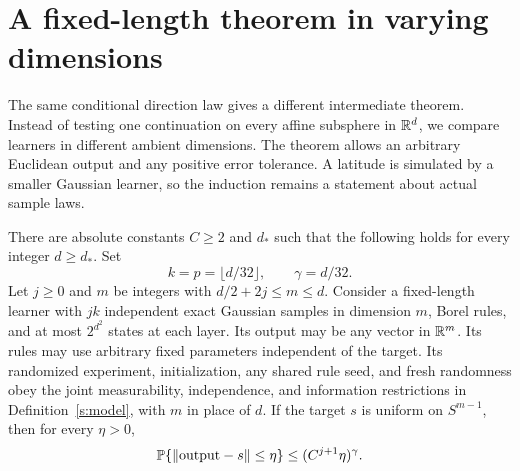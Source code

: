 \section{A fixed-length theorem in varying dimensions}\label{s:fixed-length}

The same conditional direction law gives a different intermediate
theorem. Instead of testing one continuation on every affine
subsphere in \(\mathbb R^d\), we compare learners in different ambient
dimensions. The theorem allows an arbitrary Euclidean output and any
positive error tolerance. A latitude is simulated by a smaller
Gaussian learner, so the induction remains a statement about actual
sample laws.

\begin{proposition}\label{s:fixed-proposition}
There are absolute constants \(C\ge2\) and \(d_*\) such that the
following holds for every integer \(d\ge d_*\). Set
\[
 k=p=\lfloor d/32\rfloor,\qquad \gamma=d/32.
\]
Let \(j\ge0\) and \(m\) be integers with \(d/2+2j\le m\le d\).
Consider a fixed-length learner with \(jk\) independent exact Gaussian
samples in dimension \(m\), Borel rules, and at most \(2^{d^2}\)
states at each layer. Its output may be any vector in \(\mathbb R^m\).
Its rules may use arbitrary fixed parameters independent of the
target. Its randomized experiment, initialization, any shared rule
seed, and fresh randomness obey the joint measurability, independence,
and information restrictions in Definition~\ref{s:model}, with \(m\)
in place of \(d\). If the target
\(s\) is uniform on \(S^{m-1}\), then for every \(\eta>0\),
\begin{equation}\label{s:fixed-bound}
 \mathbb P\{\left\lVert \mathrm{output}-s\right\rVert\le\eta\}
 \le(C^{j+1}\eta)^\gamma.
\end{equation}
\end{proposition}
